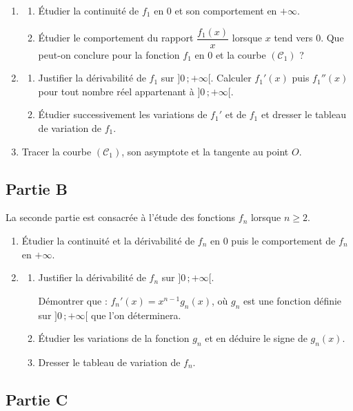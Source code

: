 \begin{enumerate}
	\item
	\begin{enumerate}
		\item Étudier la continuité de $f_1$ en $0$ et son comportement en $+\infty$.
		\item Étudier le comportement du rapport $\dfrac{f_1(x)}{x}$ lorsque $x$ tend vers $0$. Que peut-on conclure pour la fonction $f_1$ en $0$ et la courbe $(\mathscr{C}_1)$ ?
	\end{enumerate}
	\item
	\begin{enumerate}
		\item Justifier la dérivabilité de $f_1$ sur $]0\,;+\infty[$. Calculer $f_1'(x)$ puis $f_1''(x)$ pour tout nombre réel appartenant à $]0\,;+\infty[$.
		\item Étudier successivement les variations de $f_1'$ et de $f_1$ et dresser le tableau de variation de $f_1$.
	\end{enumerate}
	\item Tracer la courbe $(\mathscr{C}_1)$, son asymptote et la tangente au point $O$.
\end{enumerate}

\subsection*{Partie B}

La seconde partie est consacrée à l'étude des fonctions $f_n$ lorsque $n \geqslant 2$.

\begin{enumerate}
	\item Étudier la continuité et la dérivabilité de $f_n$ en $0$ puis le comportement de $f_n$ en $+\infty$.
	\item
	\begin{enumerate}
		\item Justifier la dérivabilité de $f_n$ sur $]0\,;+\infty[$.

		Démontrer que : $f_n'(x) = x^{n-1}g_n(x)$, où $g_n$ est une fonction définie sur $]0\,;+\infty[$ que l'on déterminera.
		\item Étudier les variations de la fonction $g_n$ et en déduire le signe de $g_n(x)$.
		\item Dresser le tableau de variation de $f_n$.
	\end{enumerate}
\end{enumerate}

\subsection*{Partie C}

